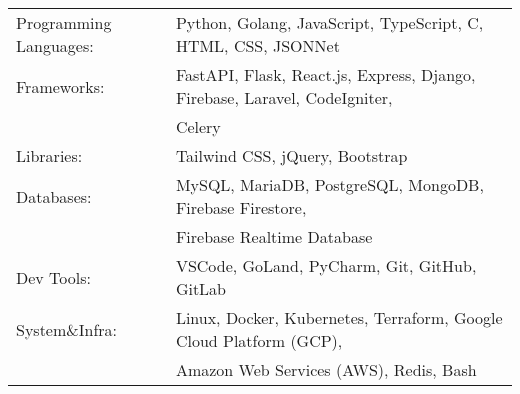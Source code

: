 \begin{tabular}{ l l }
	Programming Languages: & Python, Golang, JavaScript, TypeScript, C, HTML, CSS, JSONNet                         \\
	Frameworks:            & FastAPI, Flask, React.js, Express, Django, Firebase, Laravel, CodeIgniter,  \\ & Celery        \\
	Libraries:             & Tailwind CSS, jQuery, Bootstrap                                                          \\
	Databases:             & MySQL, MariaDB, PostgreSQL, MongoDB, Firebase Firestore, \\ & Firebase Realtime Database      \\
	Dev Tools:             & VSCode, GoLand, PyCharm, Git, GitHub, GitLab                                                    \\
	System\&Infra:         & Linux, Docker, Kubernetes, Terraform, Google Cloud Platform (GCP), \\ & Amazon Web Services (AWS), Redis, Bash \\
\end{tabular}
\vspace{2mm}

